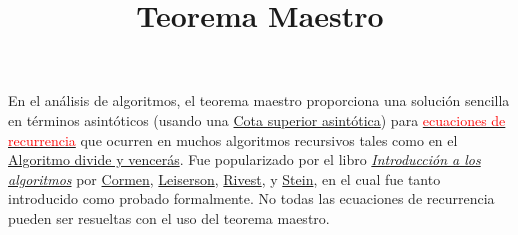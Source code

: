 \documentclass{article}
\title{\textbf{Teorema Maestro}\vspace{-3em}}
\date{}
\author{}
\begin{document}
	\maketitle
	\noindent
	En el análisis de algoritmos, el teorema maestro proporciona una solución sencilla en términos asintóticos (usando una \href{https://es.wikipedia.org/wiki/Cota_superior_asintótica}{Cota superior asintótica}) para \href{https://es.wikipedia.org/w/index.php?title=Ecuaciones_de_recurrencia&action=edit&redlink=1}{\textcolor{red}{ecuaciones de recurrencia}} que ocurren en muchos algoritmos recursivos tales como en el \href{https://es.wikipedia.org/wiki/Algoritmo_divide_y_vencerás}{Algoritmo divide y vencerás}. Fue popularizado por el libro \href{https://es.wikipedia.org/wiki/Introducción_a_los_algoritmos}{\textit{Introducción a los algoritmos}} por \href{https://es.wikipedia.org/wiki/Thomas_H._Cormen}{Cormen}, \href{https://es.wikipedia.org/wiki/Charles_E._Leiserson}{Leiserson}, \href{https://es.wikipedia.org/wiki/Ron_Rivest}{Rivest}, y \href{https://es.wikipedia.org/wiki/Clifford_Stein}{Stein}, en el cual fue tanto introducido como probado formalmente. No todas las ecuaciones de recurrencia pueden ser resueltas con el uso del teorema maestro. 

	\tableofcontents
\end{document}
